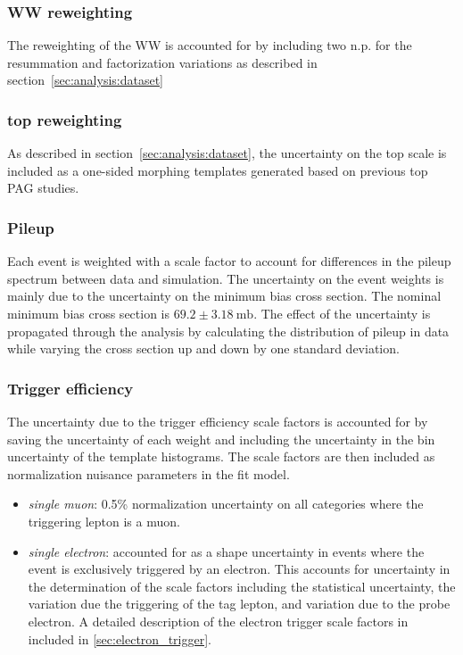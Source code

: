 \subsubsection{WW \pt reweighting}

The reweighting of the WW \pt is accounted for by including two n.p. for
the resummation and factorization variations as described in
section~\ref{sec:analysis:dataset}

\subsubsection{top \pt reweighting}

As described in section~\ref{sec:analysis:dataset}, the uncertainty on the top \pt
scale is included as a one-sided morphing templates generated based on
previous top PAG studies.

\subsubsection{Pileup}

Each event is weighted with a scale factor to account for differences in
the pileup spectrum between data and simulation.  The uncertainty on
the event weights is mainly due to the uncertainty on the minimum bias
cross section.  The nominal minimum bias cross section is $69.2 \pm
3.18~\text{mb}$. The effect of the uncertainty is propagated through the
analysis by calculating the distribution of pileup in data while varying
the cross section up and down by one standard deviation.  

\subsubsection{Trigger efficiency}

The uncertainty due to the trigger efficiency scale factors is
accounted for by saving the uncertainty of each weight and including the
uncertainty in the bin uncertainty of the template histograms.  The scale
factors are then included as normalization nuisance parameters in the
fit model.

\begin{itemize}
    \item \textit{single muon}: 0.5\% normalization uncertainty on all
        categories where the triggering lepton is a muon.
    \item \textit{single electron}: accounted for as a shape uncertainty
        in events where the event is exclusively triggered by an
        electron.  This accounts for uncertainty in the determination of
        the scale factors including the statistical uncertainty, the
        variation due the triggering of the tag lepton, and variation
        due to the probe electron.  A detailed description of the
        electron trigger scale factors in included in
        \ref{sec:electron_trigger}.
\end{itemize}


